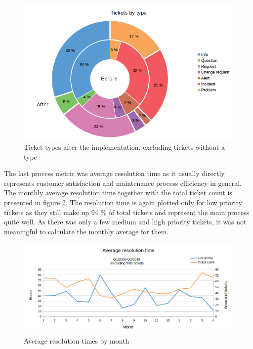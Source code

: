 \begin{figure}[ht]
  \begin{center}
    \includegraphics[width=\textwidth]{images/ticket-types-after-2.png}
    \caption{Ticket types after the implementation, excluding tickets without a type}
    \label{fig:ticket-types-after}
  \end{center}
\end{figure}

The last process metric was average resolution time as it usually directly represents customer satisfaction and maintenance process efficiency in general. The monthly average resolution time together with 
the total ticket count is presented in figure \ref{fig:resolution-times-after}. The resolution time is again plotted only for low priority tickets as they still make up 94 \% of total tickets and represent
the main process quite well. As there was only a few medium and high priority tickets, it was not meaningful to calculate the monthly average for them.

\begin{figure}[ht]
  \begin{center}
    \includegraphics[width=\textwidth]{images/resolution-time-after.png}
    \caption{Average resolution times by month}
    \label{fig:resolution-times-after}
  \end{center}
\end{figure}

